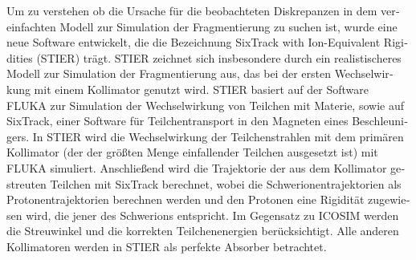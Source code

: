 \begin{otherlanguage}{german}


Um zu verstehen ob die Ursache f\"{u}r die beobachteten Diskrepanzen in dem vereinfachten \mbox{Modell} zur Simulation der Fragmentierung zu suchen ist, wurde eine neue Software entwickelt, die die Bezeichnung SixTrack with Ion-Equivalent Rigidities (STIER) tr\"{a}gt. STIER zeichnet sich insbesondere durch ein realistischeres Modell zur Simulation der Fragmentierung aus, das bei der ersten Wechselwirkung mit einem Kollimator genutzt wird. STIER basiert auf der Software \mbox{FLUKA} zur Simulation der Wechselwirkung von Teilchen mit Materie, sowie auf SixTrack, einer Software f\"{u}r Teilchentransport in den Magneten eines Beschleunigers. In STIER wird die Wechselwirkung der Teilchenstrahlen mit dem prim\"{a}ren Kollimator (der der gr\"{o}\ss ten Menge einfallender Teilchen ausgesetzt ist) mit \mbox{FLUKA} simuliert. Anschlie\ss end wird die Trajektorie der aus dem Kollimator gestreuten Teilchen mit SixTrack berechnet, wobei die Schwerionentrajektorien als Protonentrajektorien berechnen werden und den Protonen eine Rigidit\"{a}t zugewiesen wird, die jener des Schwerions entspricht. Im Gegensatz zu ICOSIM werden die Streuwinkel und die korrekten Teilchenenergien ber\"{u}cksichtigt. Alle anderen Kollimatoren werden in STIER als perfekte Absorber betrachtet.
\vspace{0.2cm}



\end{otherlanguage}
